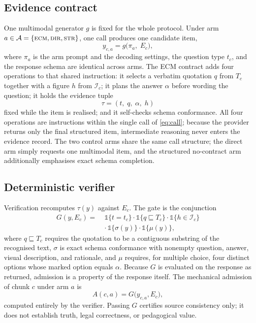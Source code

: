 \documentclass[conference]{IEEEtran}
\begin{document}
\subsection{Evidence contract}
One multimodal generator $g$ is fixed for the whole protocol. Under arm
$a\in\mathcal A=\{\textsc{ecm},\textsc{dir},\textsc{str}\}$, one call
produces one candidate item,
\begin{equation}
y_{c,a}=g\bigl(\pi_a,\;E_c\bigr),
\label{eq:call}
\end{equation}
where $\pi_a$ is the arm prompt and the decoding settings, the
question type $t_c$, and the response schema are identical across arms.
The ECM contract adds four operations to that shared instruction: it
selects a verbatim quotation $q$ from $T_c$ together with a figure $h$
from $\mathcal I_c$; it plans the answer $\alpha$ before wording the
question; it holds the evidence tuple
\begin{equation}
\tau=(t,\;q,\;\alpha,\;h)
\end{equation}
fixed while the item is realised; and it self-checks schema
conformance. All four operations are instructions within the single
call of \eqref{eq:call}; because the provider returns only the final
structured item, intermediate reasoning never enters the evidence
record. The two control arms
share the same call structure; the direct arm simply requests one
multimodal item, and the structured no-contract arm additionally
emphasises exact schema completion.

\subsection{Deterministic verifier}
Verification recomputes $\tau(y)$ against $E_c$. The gate is the
conjunction
\begin{equation}
\begin{split}
G(y,E_c)=\;&\mathbb 1\{t=t_c\}\cdot
\mathbb 1\{q\sqsubseteq T_c\}\cdot
\mathbb 1\{h\in\mathcal I_c\}\\
&\cdot\,\mathbb 1\{\sigma(y)\}\cdot
\mathbb 1\{\mu(y)\},
\end{split}
\label{eq:gate}
\end{equation}
where $q\sqsubseteq T_c$ requires the quotation to be a contiguous
substring of the recognised text, $\sigma$ is exact schema conformance
with nonempty question, answer, visual description, and rationale, and
$\mu$ requires, for multiple choice, four distinct options whose marked
option equals $\alpha$. Because $G$ is evaluated on the response as
returned, admission is a property of the response itself. The mechanical admission of
chunk $c$ under arm $a$ is
\begin{equation}
A(c,a)=G\bigl(y_{c,a},E_c\bigr),
\label{eq:admission}
\end{equation}
computed entirely by the verifier. Passing $G$ certifies source
consistency only; it does not establish truth, legal correctness, or
pedagogical value.
\end{document}
